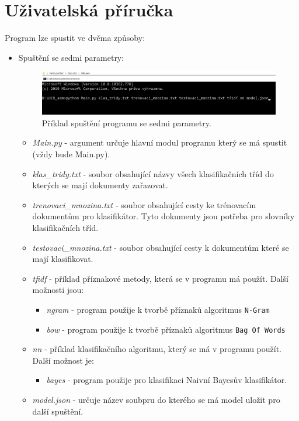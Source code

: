 \documentclass[
12pt,
a4paper,
pdftex,
czech,
titlepage
]{report}
\begin{document}
\chapter{Uživatelská příručka}
Program lze spustit ve dvěma způsoby:
\begin{itemize}
\item{Spuštění se sedmi parametry:
\begin{figure}[h]
\includegraphics[width=13cm]{obr1.png}
\caption{Příklad spuštění programu se sedmi parametry.}
\label{obr1}
\end{figure}
\begin{itemize}
\item{\textit{Main.py} - argument určuje hlavní modul programu který se má spustit (vždy bude Main.py).}
\item{\textit{klas\_tridy.txt} - soubor obsahující názvy všech klasifikačních tříd do kterých se mají dokumenty zařazovat.}
\item{\textit{trenovaci\_mnozina.txt} - soubor obsahující cesty ke trénovacím dokumentům pro klasifikátor. Tyto dokumenty jsou potřeba pro slovníky klasifikačních tříd.}
\item{\textit{testovaci\_mnozina.txt} - soubor obsahující cesty k dokumentům které se mají klasifikovat.}
\item{\textit{tfidf} - příklad příznakové metody, která se v programu má použít. Další možnosti jsou:
\begin{itemize}
\item{\textit{ngram} - program použije k tvorbě příznaků algoritmus \texttt{N-Gram}}
\item{\textit{bow} - program použije k tvorbě příznaků algoritmus \texttt{Bag Of Words}}
\end{itemize}}
\item{\textit{nn} - příklad klasifikačního algoritmu, který se má v programu použít. Další možnost je:
\begin{itemize}
\item{\textit{bayes} - program použije pro klasifikaci Naivní Bayesův klasifikátor.}
\end{itemize}
}
\item{\textit{model.json} - určuje název soubpru do kterého se má model uložit pro další spuštění.}

\end{itemize}}
\end{itemize}
\end{document}
